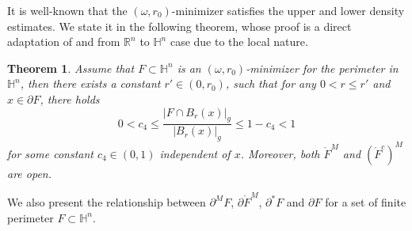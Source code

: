 \documentclass[11pt,reqno]{amsart}
\newtheorem{thm}{Theorem}[section]
\newtheorem{lem}[thm]{Lemma}
\theoremstyle{definition}
\theoremstyle{remark}
\numberwithin{equation}{section}
\renewcommand{\(}{\left(}
\renewcommand{\)}{\right)}
\renewcommand{\-}{\overline}
\begin{document}
It is well-known that the $(\omega,r_0)$-minimizer satisfies the upper and lower density estimates. We state it in the following theorem, whose proof is a direct adaptation of \cite[Theorem 6,(i),(iii)]{Caraballo11} and \cite[Theorem 21.11]{Maggi-12} from $\mathbb{R}^n$ to $\mathbb{H}^n$ case due to the local nature.
\begin{thm}\label{Lem-twoside}
	Assume that $F\subset\mathbb{H}^n$ is an $(\omega,r_0)$-minimizer for the perimeter in $\mathbb{H}^n$, then there exists a constant $r'\in(0,r_0)$,  such that for any $0<r\leq r'$ and $x\in\partial F$, there holds
	\begin{equation}\label{Eq-twoside}
		0<c_4\leq\frac{|F\cap B_r(x)|_g}{|B_r(x)|_g}\leq 1-c_4<1
	\end{equation}
	for some constant $c_4\in(0,1)$ independent of $x$. Moreover, both $\mathring{F}^M$ and $(\mathring{F}^c)^M$ are open.
\end{thm}


We also present the relationship between $\partial^M F$, $\partial\mathring{F}^M$, $\partial^{*}F$ and $\partial F$ for a set of finite perimeter $F\subset\mathbb{H}^n$.
\end{document}
